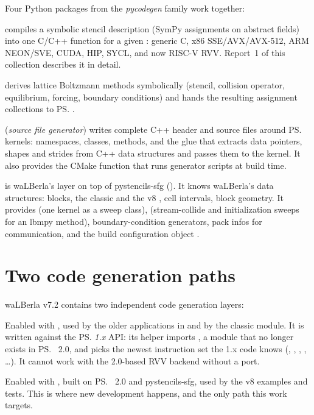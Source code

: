 Four Python packages from the \emph{pycodegen} family work together:
\begin{description}[style=nextline]
  \item[\ps{}~\cite{pystencils}] compiles a symbolic stencil description (SymPy
    assignments on abstract fields) into one C/C++ function for a given
    : generic C, x86 SSE/AVX/AVX-512, ARM NEON/SVE, CUDA, HIP, SYCL, and
    now RISC-V RVV. Report~1 of this collection describes it in detail.
  \item[lbmpy~\cite{lbmpy}] derives lattice Boltzmann methods symbolically (stencil,
    collision operator, equilibrium, forcing, boundary conditions) and hands the
    resulting assignment collections to \ps{}.
  \item[pystencils-sfg~\cite{pystencils-sfg}] (\emph{source file generator}) writes
    complete C++ header and source files around \ps{} kernels: namespaces, classes,
    methods, and the glue that extracts data pointers, shapes and strides from C++
    data structures and passes them to the kernel. It also provides the CMake function
     that runs generator scripts at build
    time.
  \item[sweepgen] is waLBerla's layer on top of pystencils-sfg
    (). It knows waLBerla's data structures: blocks, the
    classic  and the v8 , cell intervals,
    block geometry. It provides  (one kernel as a sweep class),
     (stream-collide and initialization sweeps for an lbmpy method),
    boundary-condition generators, pack infos for communication, and the build
    configuration object .
\end{description}

\section{Two code generation paths}\label{r02:sec:two-paths}

waLBerla v7.2 contains two independent code generation layers:
\begin{description}[style=nextline]
  \item[Legacy: \file{python/pystencils_walberla} and \file{lbmpy_walberla}] Enabled with
    , used by the older applications in
     and by the classic  module. It is written against
    the \ps{} \emph{1.x} API: its helper 
    imports , a module that no longer
    exists in \ps{}~2.0, and picks the newest instruction set the 1.x code knows
    (, , , , \dots). It cannot work
    with the 2.0-based RVV backend without a port.
  \item[Current: sweepgen] Enabled with , built on
    \ps{}~2.0 and pystencils-sfg, used by the v8 examples and tests. This is where new
    development happens, and the only path this work targets.
\end{description}

